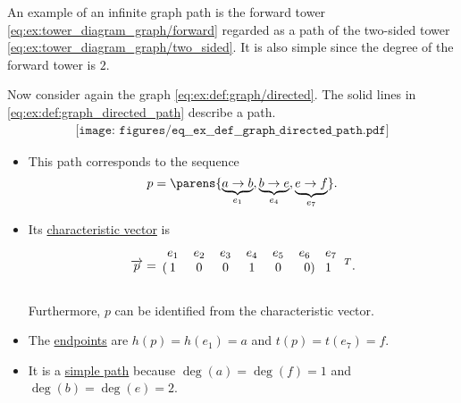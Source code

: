 \begin{example}\label{ex:def:graph_directed_path}
  An example of an infinite graph path is the forward tower \eqref{eq:ex:tower_diagram_graph/forward} regarded as a path of the two-sided tower \eqref{eq:ex:tower_diagram_graph/two_sided}. It is also simple since the degree of the forward tower is \( 2 \).

  Now consider again the graph \eqref{eq:ex:def:graph/directed}. The solid lines in \eqref{eq:ex:def:graph_directed_path} describe a path.
  \begin{equation}\label{eq:ex:def:graph_directed_path}
    \begin{aligned}
      \texttt{[image: figures/eq\_\_ex\_\_def\_\_graph\_directed\_path.pdf]}
    \end{aligned}
  \end{equation}

  \begin{itemize}
    \item This path corresponds to the sequence
    \begin{equation*}
      p = \parens{ \underbrace{a \to b}_{e_1}, \underbrace{b \to e}_{e_4}, \underbrace{e \to f}_{e_7} }.
    \end{equation*}

    \item Its \hyperref[def:graph_directed_path/characteristic_vector]{characteristic vector} is
    \begin{equation*}
      \vect{p}
      =
      \begin{blockarray}{cccccrl}
        e_1 & e_2 & e_3 & e_4 & e_5 & e_6 & e_7 \\
      \begin{block}{(cccccr)l}
        1   & 0   & 0   & 1   & 0   & 0   & 1 \\
      \end{block}
      \end{blockarray}
      {}^T.
    \end{equation*}

    Furthermore, \( p \) can be identified from the characteristic vector.

    \item The \hyperref[def:graph_directed_path/endpoints]{endpoints} are \( h(p) = h(e_1) = a \) and \( t(p) = t(e_7) = f \).

    \item It is a \hyperref[def:graph_adjacency_chain/simple]{simple path} because \( \deg(a) = \deg(f) = 1 \) and \( \deg(b) = \deg(e) = 2 \).


\end{itemize}
\end{example}
